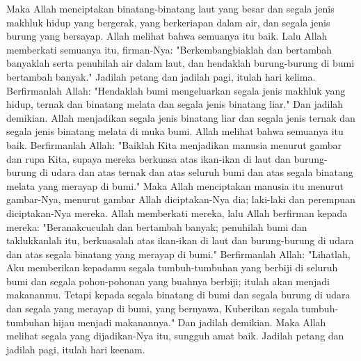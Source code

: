 \begin{biblechapter}
\verse Maka Allah menciptakan binatang-binatang laut yang besar dan segala jenis makhluk hidup yang bergerak, yang berkeriapan dalam air, dan segala jenis burung yang bersayap. Allah melihat bahwa semuanya itu baik.
\verse Lalu Allah memberkati semuanya itu, firman-Nya: "Berkembangbiaklah dan bertambah banyaklah serta penuhilah air dalam laut, dan hendaklah burung-burung di bumi bertambah banyak."
\verse Jadilah petang dan jadilah pagi, itulah hari kelima.
\verse Berfirmanlah Allah: "Hendaklah bumi mengeluarkan segala jenis makhluk yang hidup, ternak dan binatang melata dan segala jenis binatang liar." Dan jadilah demikian.
\verse Allah menjadikan segala jenis binatang liar dan segala jenis ternak dan segala jenis binatang melata di muka bumi. Allah melihat bahwa semuanya itu baik.
\verse Berfirmanlah Allah: "Baiklah Kita menjadikan manusia menurut gambar dan rupa Kita, supaya mereka berkuasa atas ikan-ikan di laut dan burung-burung di udara dan atas ternak dan atas seluruh bumi dan atas segala binatang melata yang merayap di bumi."
\verse Maka Allah menciptakan manusia itu menurut gambar-Nya, menurut gambar Allah diciptakan-Nya dia; laki-laki dan perempuan diciptakan-Nya mereka.
\verse Allah memberkati mereka, lalu Allah berfirman kepada mereka: "Beranakcuculah dan bertambah banyak; penuhilah bumi dan taklukkanlah itu, berkuasalah atas ikan-ikan di laut dan burung-burung di udara dan atas segala binatang yang merayap di bumi."
\verse Berfirmanlah Allah: "Lihatlah, Aku memberikan kepadamu segala tumbuh-tumbuhan yang berbiji di seluruh bumi dan segala pohon-pohonan yang buahnya berbiji; itulah akan menjadi makananmu.
\verse Tetapi kepada segala binatang di bumi dan segala burung di udara dan segala yang merayap di bumi, yang bernyawa, Kuberikan segala tumbuh-tumbuhan hijau menjadi makanannya." Dan jadilah demikian.
\verse Maka Allah melihat segala yang dijadikan-Nya itu, sungguh amat baik. Jadilah petang dan jadilah pagi, itulah hari keenam.
\end{biblechapter}

